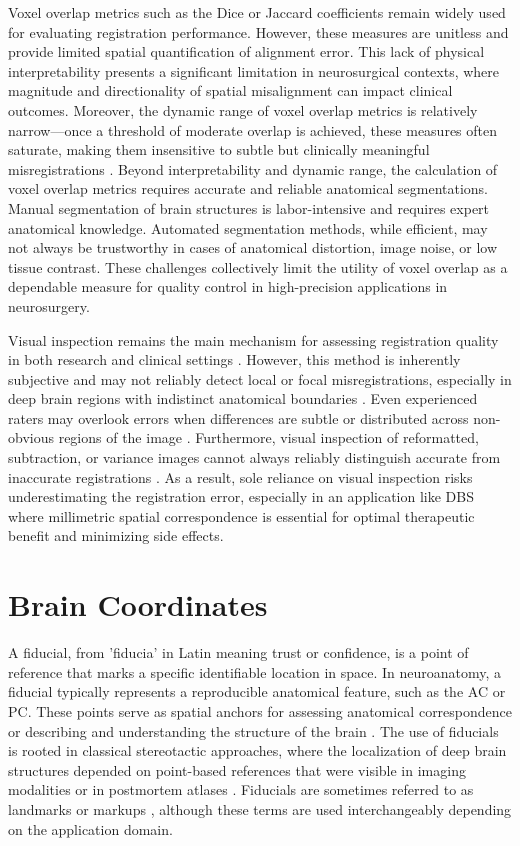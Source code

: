 Voxel overlap metrics such as the Dice or Jaccard coefficients remain widely used for evaluating registration performance. However, these measures are unitless and provide limited spatial quantification of alignment error. This lack of physical interpretability presents a significant limitation in neurosurgical contexts, where magnitude and directionality of spatial misalignment can impact clinical outcomes. Moreover, the dynamic range of voxel overlap metrics is relatively narrow—once a threshold of moderate overlap is achieved, these measures often saturate, making them insensitive to subtle but clinically meaningful misregistrations \cite{Lau2019-eh}. Beyond interpretability and dynamic range, the calculation of voxel overlap metrics requires accurate and reliable anatomical segmentations. Manual segmentation of brain structures is labor-intensive and requires expert anatomical knowledge. Automated segmentation methods, while efficient, may not always be trustworthy in cases of anatomical distortion, image noise, or low tissue contrast. These challenges collectively limit the utility of voxel overlap as a dependable measure for quality control in high-precision applications in neurosurgery.

Visual inspection remains the main mechanism for assessing registration quality in both research and clinical settings \cite{Neudorfer2023-wd,Esteban2019-oz}. However, this method is inherently subjective and may not reliably detect local or focal misregistrations, especially in deep brain regions with indistinct anatomical boundaries \cite{Bosma2024-cf,Rohlfing2012-kt}. Even experienced raters may overlook errors when differences are subtle or distributed across non-obvious regions of the image \cite{de-Senneville2020-am}. Furthermore, visual inspection of reformatted, subtraction, or variance images cannot always reliably distinguish accurate from inaccurate registrations \cite{Rohlfing2012-kt}. As a result, sole reliance on visual inspection risks underestimating the registration error, especially in an application like DBS where millimetric spatial correspondence is essential for optimal therapeutic benefit and minimizing side effects.

\section{Brain Coordinates} 
A fiducial, from 'fiducia' in Latin meaning trust or confidence, is a point of reference that marks a specific identifiable location in space. In neuroanatomy, a fiducial typically represents a reproducible anatomical feature, such as the AC or PC. These points serve as spatial anchors for assessing anatomical correspondence \cite{Schonecker2009-xj,Lau2019-eh} or describing and understanding the structure of the brain \cite{Abbass2022-lf}. The use of fiducials is rooted in classical stereotactic approaches, where the localization of deep brain structures depended on point-based references that were visible in imaging modalities or in postmortem atlases \cite{Schaltenbrand1977-ge, Talalrach1957-bs}. Fiducials are sometimes referred to as landmarks or markups \cite{Fedorov2012-rk}, although these terms are used interchangeably depending on the application domain. 
